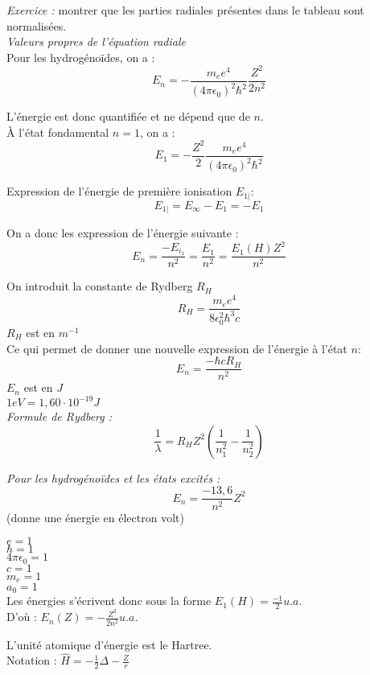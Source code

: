 \documentclass[../main.tex]{subfile}
\begin{document}
  \emph{Exercice :} montrer que les parties radiales présentes dans le tableau sont normalisées.\\


  \emph{Valeurs propres de l'équation radiale}\\

  Pour les hydrogénoïdes, on a :
  $$E_n = -\frac{m_ee^4}{(4\pi\epsilon_0)^2\hbar^2} \frac{Z^2}{2n^2}$$

  L'énergie est donc quantifiée et ne dépend que de $n$.\\

  À l'état fondamental $n=1$, on a :
  $$E_1 = -\frac{Z^2}{2}\frac{m_ee^4}{(4\pi\epsilon_0)^2\hbar^2}$$

  Expression de l'énergie de première ionisation $E_{1|}$:
  $$E_{1|} = E_\infty - E_1 = -E_1$$

  On a donc les expression de l'énergie suivante :
  $$E_n = \frac{-E_{i_1}}{n^2} = \frac{E_1}{n^2} = \frac{E_1(H)Z^2}{n^2}$$


  On introduit la constante de Rydberg $R_H$
  $$R_H = \frac{m_ee^4}{8\epsilon_0^2\hbar^3c}$$
  $R_H$ est en $m^{-1}$\\


  Ce qui permet de donner une nouvelle expression de l'énergie à l'état $n$:
  $$E_n = \frac{-\hbar c R_H}{n^2}$$
  $E_n$ est en $J$\\
  $1eV = 1,60 \cdot 10^{-19} J$\\


  \emph{Formule de Rydberg :}
  $$\frac{1}{\lambda} = R_H Z^2 (\frac{1}{n_1^2} - \frac{1}{n_2^2})$$


  \emph{Pour les hydrogénoïdes et les états excités :}\\
  $$E_n = \frac{-13,6}{n^2}Z^2$$
  (donne une énergie en électron volt)\\


\begin{rap}
   $e=1$\\
   $\hbar = 1$\\
   $4\pi\epsilon_0 = 1$\\
   $c = 1$\\
   $m_e = 1$\\
   $a_0 = 1$\\

   Les énergies s'écrivent donc sous la forme $E_1(H) = \frac{-1}{2} u.a.$\\

   D'où : $E_n(Z) = - \frac{Z^2}{2n^2} u.a.$

   L'unité atomique d'énergie est le Hartree.\\

   Notation : $\hat{H} = - \frac{1}{2} \Delta - \frac{Z}{r}$
\end{rap}
\end{document}
